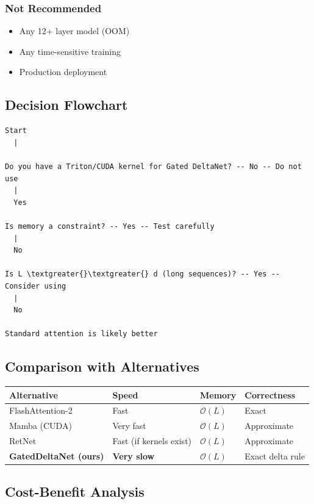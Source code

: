 \subsubsection{Not Recommended}

\begin{itemize}
\item Any 12+ layer model (OOM)
\item Any time-sensitive training
\item Production deployment

\end{itemize}
\subsection{Decision Flowchart}

\begin{lstlisting}
Start
  |
   
Do you have a Triton/CUDA kernel for Gated DeltaNet? -- No -- Do not use
  |
  Yes
   
Is memory a constraint? -- Yes -- Test carefully
  |
  No
   
Is L \textgreater{}\textgreater{} d (long sequences)? -- Yes -- Consider using
  |
  No
   
Standard attention is likely better
\end{lstlisting}

\subsection{Comparison with Alternatives}

\begin{table}[H]
\centering
\small
\begin{tabular}{llll}
\toprule
\textbf{Alternative} & \textbf{Speed} & \textbf{Memory} & \textbf{Correctness} \\
\midrule
FlashAttention-2 & Fast & $\mathcal{O}(L)$ & Exact \\
Mamba (CUDA) & Very fast & $\mathcal{O}(L)$ & Approximate \\
RetNet & Fast (if kernels exist) & $\mathcal{O}(L)$ & Approximate \\
\textbf{GatedDeltaNet (ours)} & \textbf{Very slow} & $\mathcal{O}(L)$ & Exact delta rule \\
\bottomrule
\end{tabular}
\end{table}

\subsection{Cost-Benefit Analysis}

